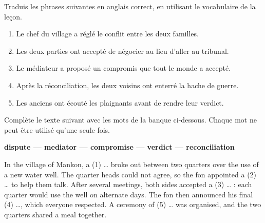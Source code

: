 \documentclass[11pt]{article}
\newcounter{popsec}
\newcounter{popsub}
\newcommand{\courssub}[1]{%
  \stepcounter{popsub}%
  \par\vspace{9pt}\noindent{\popxbold\fontsize{11.5}{13}\selectfont\color{popink}{\color{poporange}\thepopsec.\thepopsub}\hspace{6pt}#1}\par\nopagebreak\vspace{4pt}
}
\begin{document}
\courssub{Je m'entraîne}

\begin{exercice}
Traduis les phrases suivantes en anglais correct, en utilisant le vocabulaire de la leçon.

\begin{enumerate}
\item Le chef du village a réglé le conflit entre les deux familles.
\item Les deux parties ont accepté de négocier au lieu d'aller au tribunal.
\item Le médiateur a proposé un compromis que tout le monde a accepté.
\item Après la réconciliation, les deux voisins ont enterré la hache de guerre.
\item Les anciens ont écouté les plaignants avant de rendre leur verdict.
\end{enumerate}
\end{exercice}

\begin{exercice}
Complète le texte suivant avec les mots de la banque ci-dessous. Chaque mot ne peut être utilisé qu'une seule fois.

\begin{center}
\textbf{dispute — mediator — compromise — verdict — reconciliation}
\end{center}

In the village of Mankon, a (1) \ldots{} broke out between two quarters over the use of a new water well. The quarter heads could not agree, so the fon appointed a (2) \ldots{} to help them talk. After several meetings, both sides accepted a (3) \ldots{} : each quarter would use the well on alternate days. The fon then announced his final (4) \ldots{}, which everyone respected. A ceremony of (5) \ldots{} was organised, and the two quarters shared a meal together.
\end{exercice}
\end{document}

